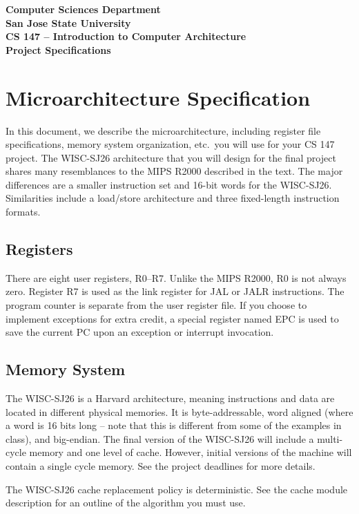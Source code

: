 \documentclass[11pt]{article}
\begin{document}
\begin{center}
{\large \textbf{Computer Sciences Department}}\\
{\large \textbf{San Jose State University}}\\[0.25\baselineskip]
{\large \textbf{CS 147 -- Introduction to Computer Architecture}}\\[0.5\baselineskip]
{\Large \textbf{Project Specifications}}
\end{center}

\section{Microarchitecture Specification}

In this document, we describe the microarchitecture, including register file specifications, memory system organization, etc.\ you will use for your CS 147 project. The WISC-SJ26 architecture that you will design for the final project shares many resemblances to the MIPS R2000 described in the text. The major differences are a smaller instruction set and 16-bit words for the WISC-SJ26. Similarities include a load/store architecture and three fixed-length instruction formats.

\subsection{Registers}
There are eight user registers, R0--R7. Unlike the MIPS R2000, R0 is not always zero. Register R7 is used as the link register for JAL or JALR instructions. The program counter is separate from the user register file. If you choose to implement exceptions for extra credit, a special register named EPC is used to save the current PC upon an exception or interrupt invocation.

\subsection{Memory System}
The WISC-SJ26 is a Harvard architecture, meaning instructions and data are located in different physical memories. It is byte-addressable, word aligned (where a word is 16 bits long -- note that this is different from some of the examples in class), and big-endian. The final version of the WISC-SJ26 will include a multi-cycle memory and one level of cache. However, initial versions of the machine will contain a single cycle memory. See the project deadlines for more details.

The WISC-SJ26 cache replacement policy is deterministic. See the cache module description for an outline of the algorithm you must use.
\end{document}
